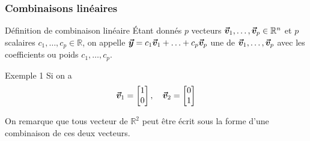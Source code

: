 \documentclass{article}
\begin{document}
\subsubsection{Combinaisons linéaires}
\begin{parag}{Définition de combinaison linéaire}
    Étant donnés $p$ vecteurs $\bm{\protect\vec{v}}_1, \ldots, \bm{\protect\vec{v}}_p \in \mathbb{R}^n$ et $p$ scalaires $c_1, \ldots, c_p \in \mathbb{R}$, on appelle $\bm{\protect\vec{y}} = c_1 \bm{\protect\vec{v}}_1 + \ldots + c_p \bm{\protect\vec{v}}_p$ une  de $\bm{\protect\vec{v}}_1, \ldots, \bm{\protect\vec{v}}_p$ avec les coefficients ou poids $c_1, \ldots, c_p$.
\end{parag}

\begin{parag}{Exemple 1}
    Si on a
    \[\bm{\protect\vec{v}}_1 = \begin{bmatrix} 1 \\ 0 \end{bmatrix}, \quad \bm{\protect\vec{v}}_2 = \begin{bmatrix} 0 \\ 1 \end{bmatrix} \]

    On remarque que tous vecteur de $\mathbb{R}^2$ peut être écrit sous la forme d'une combinaison de ces deux vecteurs.
\end{parag}
\end{document}
